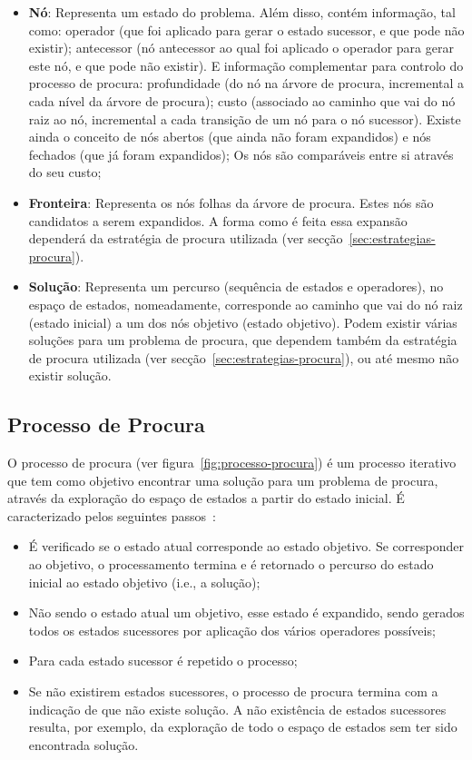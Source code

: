 \begin{itemize}
    \item \textbf{Nó}: Representa um estado do problema.
    Além disso, contém informação, tal como: operador (que foi aplicado para gerar o estado sucessor, e que pode não existir); antecessor (nó antecessor ao qual foi aplicado o operador para gerar este nó, e que pode não existir).
    E informação complementar para controlo do processo de procura: profundidade (do nó na árvore de procura, incremental a cada nível da árvore de procura); custo (associado ao caminho que vai do nó raiz ao nó, incremental a cada transição de um nó para o nó sucessor).
    Existe ainda o conceito de nós abertos (que ainda não foram expandidos) e nós fechados (que já foram expandidos);
    Os nós são comparáveis entre si através do seu custo;
    \item \textbf{Fronteira}: Representa os nós folhas da árvore de procura.
    Estes nós são candidatos a serem expandidos.
    A forma como é feita essa expansão dependerá da estratégia de procura utilizada (ver secção~\ref{sec:estrategias-procura}).
    \item \textbf{Solução}: Representa um percurso (sequência de estados e operadores), no espaço de estados, nomeadamente, corresponde ao caminho que vai do nó raiz (estado inicial) a um dos nós objetivo (estado objetivo).
    Podem existir várias soluções para um problema de procura, que dependem também da estratégia de procura utilizada (ver secção~\ref{sec:estrategias-procura}), ou até mesmo não existir solução.
\end{itemize}

\subsection{Processo de Procura}\label{subsec:processo-procura}

O processo de procura (ver figura~\ref{fig:processo-procura}) é um processo iterativo que tem como objetivo encontrar uma solução para um problema de procura, através da exploração do espaço de estados a partir do estado inicial.
É caracterizado pelos seguintes passos~\cite{isel:iasa:slides:proc-espaco-estados-parte-1}:

\begin{itemize}
    \item É verificado se o estado atual corresponde ao estado objetivo.
    Se corresponder ao objetivo, o processamento termina e é retornado o percurso do estado inicial ao estado objetivo (i.e., a solução);
    \item Não sendo o estado atual um objetivo, esse estado é expandido, sendo gerados todos os estados sucessores por aplicação dos vários operadores possíveis;
    \item Para cada estado sucessor é repetido o processo;
    \item Se não existirem estados sucessores, o processo de procura termina com a indicação de que não existe solução. A não existência de estados sucessores resulta, por exemplo, da exploração de todo o espaço de estados sem ter sido encontrada solução.
\end{itemize}

